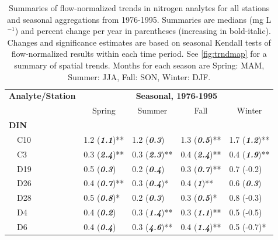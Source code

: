 \documentclass[journal = esthag, manuscript = article]{achemso}\usepackage[]{graphicx}\usepackage[]{color}
\begin{document}
\begin{suppinfo}
\begin{table}[!tbp]
\caption{Summaries of flow-normalized trends in nitrogen analytes for all stations and seasonal aggregations from 1976-1995. Summaries are  medians (mg L$^{-1}$) and percent change per year in parentheses (increasing in bold-italic). Changes and significance estimates are based on seasonal Kendall tests of flow-normalized results within each time period. See \cref{fig:trndmap} for a summary of spatial trends. Months for each season are Spring: MAM, Summer: JJA, Fall: SON, Winter: DJF.\label{tab:trndsbef}} 
\begin{center}
\begin{tabular}{lllll}
\hline\hline
\multicolumn{1}{l}{\bfseries Analyte/Station}&\multicolumn{4}{c}{\bfseries Seasonal, 1976-1995}\tabularnewline
\cline{2-5}
\multicolumn{1}{l}{}&\multicolumn{1}{c}{Spring}&\multicolumn{1}{c}{Summer}&\multicolumn{1}{c}{Fall}&\multicolumn{1}{c}{Winter}\tabularnewline
\hline
{\bfseries DIN}&&&&\tabularnewline
~~C10&1.2 \footnotesize{(\textit{\textbf{1.1}})**}&1.2 \footnotesize{(\textit{\textbf{0.3}})}&1.3 \footnotesize{(\textit{\textbf{0.5}})**}&1.7 \footnotesize{(\textit{\textbf{1.2}})**}\tabularnewline
~~C3&0.3 \footnotesize{(\textit{\textbf{2.4}})**}&0.3 \footnotesize{(\textit{\textbf{2.3}})**}&0.4 \footnotesize{(\textit{\textbf{2.4}})**}&0.4 \footnotesize{(\textit{\textbf{1.9}})**}\tabularnewline
~~D19&0.5 \footnotesize{(\textit{\textbf{0.3}})}&0.2 \footnotesize{(\textit{\textbf{0.4}})}&0.3 \footnotesize{(\textit{\textbf{0.7}})**}&0.7 \footnotesize{(-0.2)}\tabularnewline
~~D26&0.4 \footnotesize{(\textit{\textbf{0.7}})**}&0.3 \footnotesize{(\textit{\textbf{0.4}})*}&0.4 \footnotesize{(\textit{\textbf{1}})**}&0.6 \footnotesize{(\textit{\textbf{0.3}})}\tabularnewline
~~D28&0.5 \footnotesize{(\textit{\textbf{0.8}})*}&0.2 \footnotesize{(\textit{\textbf{0.3}})}&0.3 \footnotesize{(\textit{\textbf{0.5}})*}&0.8 \footnotesize{(-0.3)}\tabularnewline
~~D4&0.4 \footnotesize{(\textit{\textbf{0.2}})}&0.3 \footnotesize{(\textit{\textbf{1.4}})**}&0.3 \footnotesize{(\textit{\textbf{1.1}})**}&0.5 \footnotesize{(-0.5)}\tabularnewline
~~D6&0.4 \footnotesize{(\textit{\textbf{0.4}})}&0.3 \footnotesize{(\textit{\textbf{4.6}})**}&0.4 \footnotesize{(\textit{\textbf{1.4}})**}&0.5 \footnotesize{(-0.7)*}\tabularnewline

\end{tabular}
\end{center}
\end{table}
\end{suppinfo}
\end{document}
